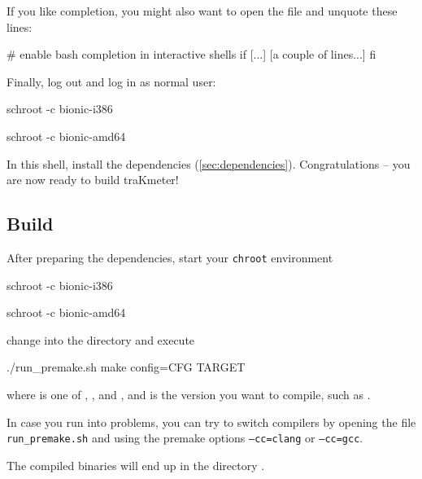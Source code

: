 If you like  completion, you might also want to open the
file  and unquote these lines:

\begin{VerbatimBoth}
  # enable bash completion in interactive shells
  if [...]
    [a couple of lines...]
  fi
\end{VerbatimBoth}

Finally, log out and log in as normal user:

\begin{Verbatim32}
  schroot -c bionic-i386
\end{Verbatim32}

\begin{Verbatim64}
  schroot -c bionic-amd64
\end{Verbatim64}

In this  shell, install the dependencies
(\ref{sec:dependencies}).  Congratulations -- you are now ready to
build traKmeter!

\subsection{Build}

After preparing the dependencies, start your \texttt{chroot}
environment

\begin{Verbatim32}
  schroot -c bionic-i386
\end{Verbatim32}

\begin{Verbatim64}
  schroot -c bionic-amd64
\end{Verbatim64}

change into the directory  and execute

\begin{VerbatimBoth}
  ./run_premake.sh
  make config=CFG TARGET
\end{VerbatimBoth}

where  is one of ,
,  and
, and  is the version
you want to compile, such as .

In case you run into problems, you can try to switch compilers by
opening the file \texttt{run\_premake.sh} and using the premake
options \texttt{--cc=clang} or \texttt{--cc=gcc}.

The compiled binaries will end up in the directory .

